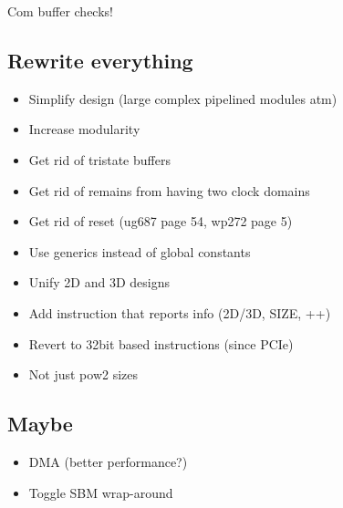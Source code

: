\TODO Com buffer checks!

\subsection{Rewrite everything}

\begin{itemize}
    \item Simplify design (large complex pipelined modules atm)
    \item Increase modularity
    \item Get rid of tristate buffers
    \item Get rid of remains from having two clock domains
    \item Get rid of reset (ug687 page 54, wp272 page 5)
    \item Use generics instead of global constants
    \item Unify 2D and 3D designs
    \item Add instruction that reports info (2D/3D, SIZE, ++)
    \item Revert to 32bit based instructions (since PCIe)
    \item Not just pow2 sizes
\end{itemize}

\subsection{Maybe}

\begin{itemize}
    \item DMA (better performance?)
    \item Toggle SBM wrap-around
\end{itemize}

